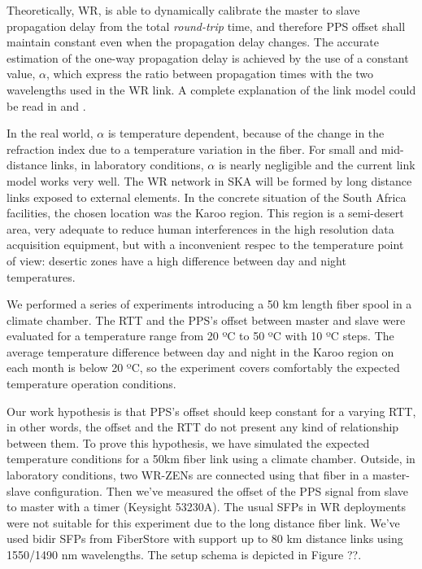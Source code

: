 
Theoretically, WR, is able to dynamically calibrate the master to slave 
propagation delay from the total \textit{round-trip} time,  and therefore PPS offset shall maintain constant even 
when the propagation delay changes. The accurate estimation of the one-way 
propagation delay is achieved by the use of a constant value, $\alpha$, which 
express the ratio between propagation times with the two wavelengths used in 
the WR link. A complete explanation of the link model could be read in 
\cite{Wlostowski2011} and \cite{Daniluk2012}.

In the real world, $\alpha$ is temperature dependent, because of the change in 
the refraction index due to a temperature variation in the fiber. For small and 
mid-distance links, in laboratory conditions, $\alpha$ is nearly negligible and 
the current link model works very well. The WR network in SKA will be formed by 
long distance links exposed to external elements. In the concrete situation of 
the South Africa facilities, the chosen location was the Karoo region. 
 This region is a 
semi-desert area, very adequate to reduce human interferences in the high 
resolution data acquisition equipment, but with a inconvenient respec to the 
temperature point of view: desertic zones have a high difference between day 
and night temperatures.

We performed a series of experiments introducing a 50 km length fiber spool in 
a climate chamber. The RTT and the PPS's offset between master and slave were 
evaluated for a temperature range from 20 ºC to 50 ºC with 10 ºC steps. The 
average temperature difference between day and night in the Karoo region on 
each month is below 20 ºC, so the experiment covers comfortably the expected 
temperature operation conditions.

Our work hypothesis is that PPS's offset should keep constant for a varying 
RTT, in other words, the offset and the RTT do not present any kind of 
relationship between them. To prove this hypothesis, we have simulated the 
expected temperature conditions for a 50km fiber link using a climate chamber. 
Outside, in laboratory conditions, two WR-ZENs are connected using that fiber 
in a master-slave configuration. Then we've measured the offset of the PPS 
signal from slave to master with a timer (Keysight 53230A). The usual SFPs in 
WR deployments were not suitable for this experiment due to the long distance 
fiber link. We've used bidir SFPs from FiberStore with support up to 80 km 
distance links using 1550/1490 nm wavelengths. The setup schema is depicted in 
Figure ??. 


